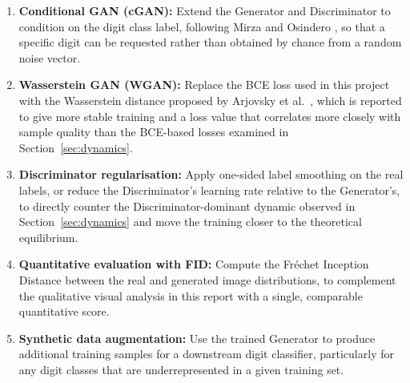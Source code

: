\documentclass[12pt,a4paper]{article}
\begin{document}
\begin{enumerate}
    \item \textbf{Conditional GAN (cGAN):} Extend the Generator and Discriminator to
          condition on the digit class label, following Mirza and
          Osindero \cite{mirza2014}, so that a specific digit can be requested rather
          than obtained by chance from a random noise vector.
    \item \textbf{Wasserstein GAN (WGAN):} Replace the BCE loss used in this project with
          the Wasserstein distance proposed by Arjovsky et al.\ \cite{arjovsky2017}, which
          is reported to give more stable training and a loss value that correlates more
          closely with sample quality than the BCE-based losses examined in
          Section~\ref{sec:dynamics}.
    \item \textbf{Discriminator regularisation:} Apply one-sided label smoothing on the
          real labels, or reduce the Discriminator's learning rate relative to the
          Generator's, to directly counter the Discriminator-dominant dynamic observed in
          Section~\ref{sec:dynamics} and move the training closer to the theoretical
          equilibrium.
    \item \textbf{Quantitative evaluation with FID:} Compute the Fr\'{e}chet Inception
          Distance between the real and generated image distributions, to complement the
          qualitative visual analysis in this report with a single, comparable
          quantitative score.
    \item \textbf{Synthetic data augmentation:} Use the trained Generator to produce
          additional training samples for a downstream digit classifier, particularly for
          any digit classes that are underrepresented in a given training set.
\end{enumerate}
\end{document}

